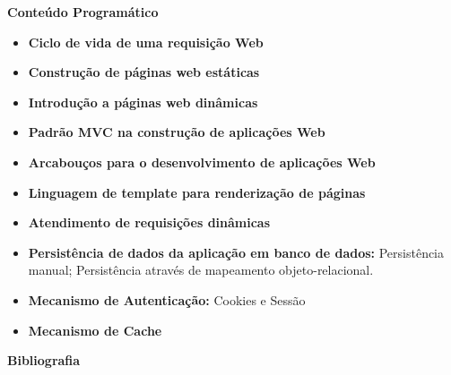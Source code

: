 
\begin{snugshade}\begin{center}\textbf{
    Conteúdo Programático
}\end{center}\end{snugshade}

\begin{itemize}

\item \textbf{Ciclo de vida de uma requisição Web}
\item \textbf{Construção de páginas web estáticas}
\item \textbf{Introdução a páginas web dinâmicas}
\item \textbf{Padrão MVC na construção de aplicações Web}
\item \textbf{Arcabouços para o desenvolvimento de aplicações Web}
\item \textbf{Linguagem de template para renderização de páginas}
\item \textbf{Atendimento de requisições dinâmicas}
\item \textbf{Persistência de dados da aplicação em banco de dados:}
    Persistência manual; Persistência através de mapeamento objeto-relacional.
\item \textbf{Mecanismo de Autenticação:}
    Cookies e Sessão
\item \textbf{Mecanismo de Cache}
  

\end{itemize}







\begin{snugshade}\begin{center}\textbf{
    Bibliografia
}\end{center}\end{snugshade}

